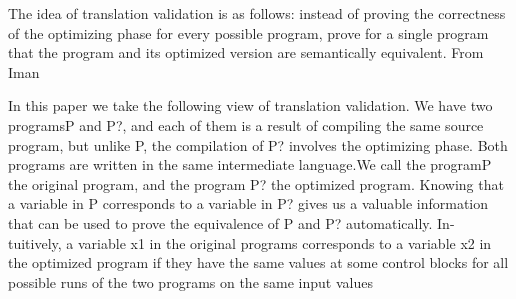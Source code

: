 The idea of translation validation is as follows: instead of proving the correctness of the optimizing phase for every possible program, prove for a single program that the program and its optimized version are semantically equivalent.
From Iman \etal~\cite{Iman2005} 

In this paper we take the following view of translation validation. We have two
programsP and P?, and each of them is a result of compiling the same source program, but unlike P, the compilation of P? involves the optimizing phase. Both programs are written in the same intermediate language.We call the programP the original program, and the program P? the optimized program.
Knowing that a variable in P corresponds to a variable in P? gives us a valuable
information that can be used to prove the equivalence of P and P? automatically. In- tuitively, a variable x1 in the original programs corresponds to a variable x2 in the optimized program if they have the same values at some control blocks for all possible runs of the two programs on the same input values
